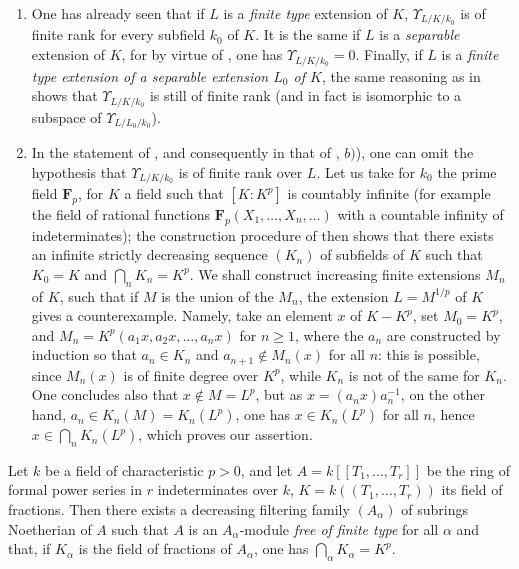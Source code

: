 \begin{remarks}[21.8.7]
\label{0.21.8.7}
\begin{enumerate}
  \item[(i)] One has already seen  that if $L$ is a \emph{finite type} extension of $K$, $\Upsilon_{L/K/k_0}$ is of finite rank for every subfield $k_0$ of $K$.
    It is the same if $L$ is a \emph{separable} extension of $K$, for by virtue of , one has $\Upsilon_{L/K/k_0}=0$.
    Finally, if $L$ is a \emph{finite type extension of a separable extension $L_0$ of $K$}, the same reasoning as in  shows that $\Upsilon_{L/K/k_0}$ is still of finite rank (and in fact is isomorphic to a subspace of $\Upsilon_{L/L_0/k_0}$).
  \item[(ii)] In the statement of , and consequently in that of , $b)$), one can omit the hypothesis that $\Upsilon_{L/K/k_0}$ is of finite rank over $L$.
    Let us take for $k_0$ the prime field $\mathbf{F}_p$, for $K$ a field such that $[K:K^p]$ is countably infinite (for example the field of rational functions $\mathbf{F}_p(X_1,\ldots,X_n,\ldots)$ with a countable infinity of indeterminates);
    the construction procedure of  then shows that there exists an infinite strictly decreasing sequence $(K_n)$ of subfields of $K$ such that $K_0=K$ and $\bigcap_n K_n=K^p$.
    We shall construct increasing finite extensions $M_n$ of $K$, such that if $M$ is the union of the $M_n$, the extension $L=M^{1/p}$ of $K$ gives  a counterexample.
    Namely, take an element $x$ of $K-K^p$, set $M_0=K^p$, and $M_n=K^p(a_1 x,a_2 x,\ldots,a_n x)$ for $n\geqslant 1$, where the $a_n$ are constructed by induction so that $a_n\in K_n$ and $a_{n+1}\notin M_n(x)$ for all $n$: this is possible, since $M_n(x)$ is of finite degree over $K^p$, while $K_n$ is not of the same for $K_n$.
    One concludes also that $x\notin M=L^p$, but as $x=(a_n x)a_n^{-1}$, on the other hand, $a_n\in K_n(M)=K_n(L^p)$, one has $x\in K_n(L^p)$ for all $n$, hence $x\in\bigcap_n K_n(L^p)$, which proves our assertion.
\end{enumerate}
\end{remarks}

\begin{proposition}[21.8.8]
\label{0.21.8.8}
Let $k$ be a field of characteristic $p>0$, and let $A=k[[T_1,\ldots,T_r]]$ be the ring of formal power series in $r$ indeterminates over $k$, $K=k((T_1,\ldots,T_r))$ its field of fractions.
Then there exists a decreasing filtering family $(A_\alpha)$ of subrings Noetherian of $A$ such that $A$ is an $A_\alpha$-module \emph{free of finite type} for all $\alpha$ and that, if $K_\alpha$ is the field of fractions of $A_\alpha$, one has $\bigcap_\alpha K_\alpha=K^p$.
\end{proposition}

